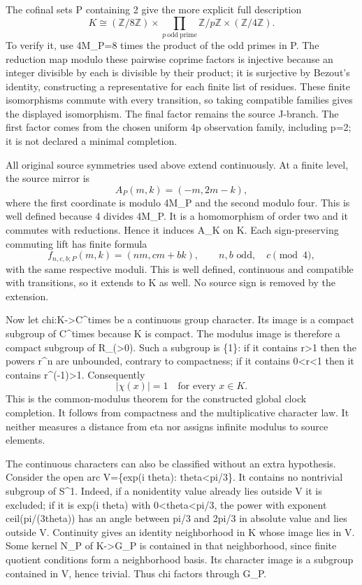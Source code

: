 \documentclass[
  11pt,
]{article}
\begin{document}
The cofinal sets P containing 2 give the more explicit full description
\[
K\cong(\mathbb Z/8\mathbb Z)\times
\prod_{p\ \mathrm{odd\ prime}}\mathbb Z/p\mathbb Z
\times(\mathbb Z/4\mathbb Z).
\] To verify it, use 4M\_P=8 times the product of the odd primes in P.
The reduction map modulo these pairwise coprime factors is injective
because an integer divisible by each is divisible by their product; it
is surjective by Bezout's identity, constructing a representative for
each finite list of residues. These finite isomorphisms commute with
every transition, so taking compatible families gives the displayed
isomorphism. The final factor remains the source J-branch. The first
factor comes from the chosen uniform 4p observation family, including
p=2; it is not declared a minimal completion.

All original source symmetries used above extend continuously. At a
finite level, the source mirror is \[
A_P(m,k)=(-m,2m-k),
\] where the first coordinate is modulo 4M\_P and the second modulo
four. This is well defined because 4 divides 4M\_P. It is a homomorphism
of order two and it commutes with reductions. Hence it induces A\_K on
K. Each sign-preserving commuting lift has finite formula \[
f_{n,c,b;P}(m,k)=(nm,cm+bk),
\qquad n,b\text{ odd},\quad c\pmod4,
\] with the same respective moduli. This is well defined, continuous and
compatible with transitions, so it extends to K as well. No source sign
is removed by the extension.

Now let chi:K-\textgreater C\^{}times be a continuous group character.
Its image is a compact subgroup of C\^{}times because K is compact. The
modulus image is therefore a compact subgroup of R\_(\textgreater0).
Such a subgroup is \{1\}: if it contains r\textgreater1 then the powers
r\^{}n are unbounded, contrary to compactness; if it contains
0\textless r\textless1 then it contains r\^{}(-1)\textgreater1.
Consequently \[
\boxed{|\chi(x)|=1\quad\text{for every }x\in K.}
\] This is the common-modulus theorem for the constructed global clock
completion. It follows from compactness and the multiplicative character
law. It neither measures a distance from eta nor assigns infinite
modulus to source elements.

The continuous characters can also be classified without an extra
hypothesis. Consider the open arc V=\{exp(i theta):
\textbar theta\textbar\textless pi/3\}. It contains no nontrivial
subgroup of S\^{}1. Indeed, if a nonidentity value already lies outside
V it is excluded; if it is exp(i theta) with
0\textless\textbar theta\textbar\textless pi/3, the power with exponent
ceil(pi/(3\textbar theta\textbar)) has an angle between pi/3 and 2pi/3
in absolute value and lies outside V. Continuity gives an identity
neighborhood in K whose image lies in V. Some kernel N\_P of
K-\textgreater G\_P is contained in that neighborhood, since finite
quotient conditions form a neighborhood basis. Its character image is a
subgroup contained in V, hence trivial. Thus chi factors through G\_P.
\end{document}
